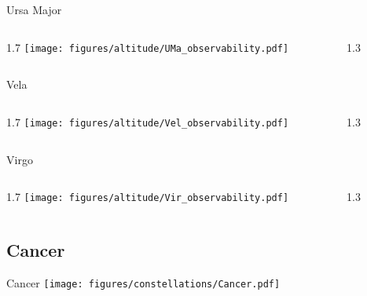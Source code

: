 \documentclass[final]{beamer}
\newlength{\colwidth}
\begin{document}
\begin{frame}[t]{}

  \Large{Ursa Major}
  \begin{columns}[T]
    \begin{column}{1.7\colwidth}
      \centering
      \texttt{[image: figures/altitude/UMa\_observability.pdf]}
    \end{column}
    \begin{column}{1.3\colwidth}
      \Large
      
    \end{column}
  \end{columns}

  \Large{Vela}
  \begin{columns}[T]
    \begin{column}{1.7\colwidth}
      \centering
      \texttt{[image: figures/altitude/Vel\_observability.pdf]}
    \end{column}
    \begin{column}{1.3\colwidth}
      \Large
      
    \end{column}
  \end{columns}

  \Large{Virgo}
  \begin{columns}[T]
    \begin{column}{1.7\colwidth}
      \centering
      \texttt{[image: figures/altitude/Vir\_observability.pdf]}
    \end{column}
    \begin{column}{1.3\colwidth}
      \Large
      
    \end{column}
  \end{columns}
\end{frame}

\subsection{Cancer}

\begin{frame}[t]{\LARGE Cancer}
  \centering
  \texttt{[image: figures/constellations/Cancer.pdf]}
\end{frame}

\end{document}
